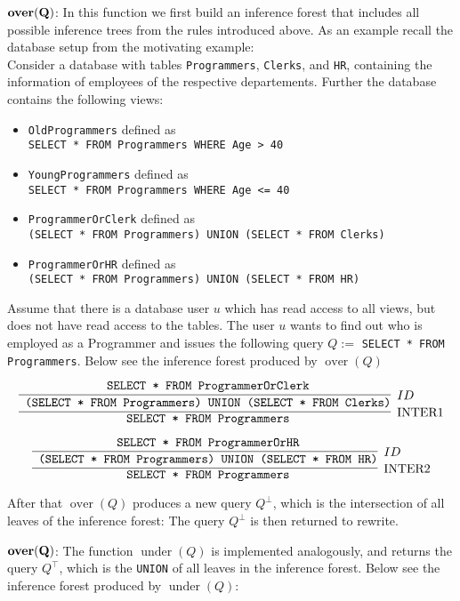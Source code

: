 \smallskip
\noindent
{$\mathbf{ \mathrm{\bf over}(Q)}$:}
%
In this function we first build an inference forest that includes all possible inference trees from the rules introduced above.
%
As an example recall the database setup from the motivating example:
\\
Consider a database with tables \texttt{Programmers}, \texttt{Clerks}, and \texttt{HR}, containing the information of employees of the respective departements.
%
Further the database contains the following views:
\begin{itemize}
	\item \texttt{OldProgrammers} defined as \\ \texttt{SELECT * FROM Programmers WHERE Age > 40}
	\item \texttt{YoungProgrammers} defined as \\ \texttt{SELECT * FROM Programmers WHERE Age <= 40}
	\item \texttt{ProgrammerOrClerk} defined as \\ \texttt{(SELECT * FROM Programmers) UNION (SELECT * FROM Clerks)}
	\item \texttt{ProgrammerOrHR} defined as \\ \texttt{(SELECT * FROM Programmers) UNION (SELECT * FROM HR)}
\end{itemize}
%
Assume that there is a database user $u$ which has read access to all views, but does not have read access to the tables.
%
The user $u$ wants to find out who is employed as a Programmer and issues the following query $Q := $ \texttt{SELECT * FROM Programmers}. 
%
Below see the inference forest produced by $\operatorname{over}(Q)$

\[
\infer[\text{INTER1}]
	{\text{\texttt{ SELECT * FROM Programmers}}}
	{
		\infer[ID]
		{\text{\texttt{ (SELECT * FROM Programmers) UNION (SELECT * FROM Clerks)}}}
		{\text{\texttt{ SELECT * FROM ProgrammerOrClerk}}}
	}
\]

\[
\infer[\text{INTER2}]
	{\text{\texttt{ SELECT * FROM Programmers}}}
	{
		\infer[ID]
		{\text{\texttt{ (SELECT * FROM Programmers) UNION (SELECT * FROM HR)}}}
		{\text{\texttt{ SELECT * FROM ProgrammerOrHR}}}
	}	
\]

After that $\operatorname{over}(Q)$ produces a new query $Q^\bot$, which is the intersection of all leaves of the inference forest: 
%
The query $Q^\bot$ is then returned to rewrite.

\smallskip
\noindent
{$\mathbf{ \mathrm{\bf over}(Q)}$:}
The function $\operatorname{under}(Q)$ is implemented analogously, and returns the query $Q^\top$, which is the \texttt{UNION} of all leaves in the inference forest. Below see the inference forest produced by $\operatorname{under}(Q)$:


